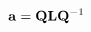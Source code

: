 \vspace{-0.1cm}
\begin{equation}
    \mathbf{a} = \mathbf{Q} \mathbf{L} \mathbf{Q}^{-1}
    \label{eq:a_matrix}
    \vspace{-0.05cm}
\end{equation}